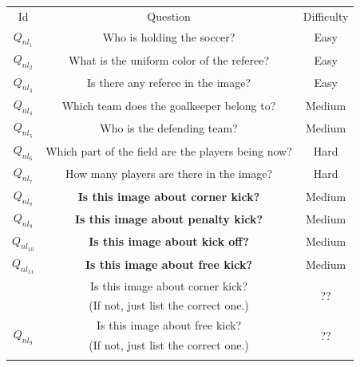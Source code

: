 \begin{table}[thb]
	\renewcommand{\arraystretch}{1}
	\begin{center}
		\footnotesize		
		\begin{tabular}{c|c|c}
			\Xhline{1pt}
			Id & Question                                           & Difficulty \\ \Xhline{0.7pt}
			$Q_{nl_1}$  & Who is holding the soccer?                         & Easy       \\ \hline
			$Q_{nl_2}$  & What is the uniform color of the referee?           & Easy       \\ \hline
			$Q_{nl_3}$  & Is there any referee in the image?                 & Easy       \\ \hline
			$Q_{nl_4}$  & Which team does the goalkeeper belong to?          & Medium       \\ \hline
			$Q_{nl_5}$  & Who is the defending team?                         & Medium       \\ \hline
			$Q_{nl_6}$  & Which part of the field are the players being now? & Hard       \\ \hline
			$Q_{nl_7}$  & How many players are there in the image?           & Hard     \\ \hline
			$Q_{nl_8}$  & \textbf{Is this image about corner kick?}                  & Medium
			\\ \hline
			$Q_{nl_9}$  & \textbf{Is this image about penalty kick?}                   & Medium
			\\ \hline
			$Q_{nl_10}$  & \textbf{Is this image about kick off?}                     & Medium
			\\ \hline
			$Q_{nl_{11}}$  & \textbf{Is this image about free kick?}                 & Medium
			\\ \hline
			\eat{
			\multirow{2}{*}{$Q_{nl_8}$ }
			& Is this image about corner kick?           &  \multirow{2}{*}{\color{red}??}  \\ 
			& {\color{red}(If not, just list the correct one.)}  & \\ \hline
			
			\multirow{2}{*}{$Q_{nl_{9}}$}  &  Is this image about free kick?  &  \multirow{2}{*}{\color{red}??}    \\ 
			& {\color{red}(If not, just list the correct one.)}  &  \\ \hline
			
}
\end{tabular}
\end{center}
\end{table}
